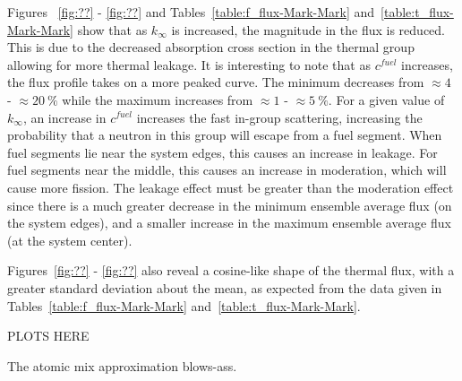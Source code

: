 \noindent
	\indent Figures ~\ref{fig:??} - \ref{fig:??} and Tables~\ref{table:f_flux-Mark-Mark}
	and~\ref{table:t_flux-Mark-Mark} show that as ${k_{\infty}}$ is increased, the magnitude
	in the flux is reduced.  This is due to the decreased absorption cross section in the 
	thermal group allowing for more thermal leakage.  It is interesting to note that as ${c^{fuel}}$
	increases, the flux profile takes on a more peaked curve.  The minimum decreases from 
	${\approx4}$ - ${\approx20\ \%}$ while the maximum increases from ${\approx1}$ - 
	${\approx5\ \%}$.  For a given value of ${k_{\infty}}$, an increase in ${c^{fuel}}$ increases the
	fast in-group scattering, increasing the probability that a neutron in this group will escape 
	from a fuel segment.  When fuel segments lie near the system edges, this causes an increase
	in leakage.  For fuel segments near the middle, this causes an increase in moderation, which
	will cause more fission.  The leakage effect must be greater than the moderation effect since
	there is a much greater decrease in the minimum ensemble average flux (on the system edges),
	and a smaller increase in the maximum ensemble average flux (at the system center).  
	
\noindent
	\indent  Figures~\ref{fig:??} - \ref{fig:??} also reveal a cosine-like shape of the thermal flux, 
	with a greater standard deviation about the mean, as expected from the data given in
	Tables~\ref{table:f_flux-Mark-Mark} and~\ref{table:t_flux-Mark-Mark}.  
	
		PLOTS HERE
	
	The atomic mix approximation blows-ass. 
   
   
   
   
   
   
   
   
   
   
   
   
   
   
   
